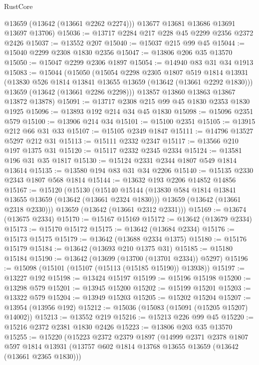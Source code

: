 \begin{lexlean}{RustCore}
\begin{coremodule}
        @13659
        (@13642 (@13661 @2262 @2274)))
      @13677
      @13681
      @13686
      @13691
      @13697
      @13706)
@15036 := @13717 @2284 @217 @228 @45 @2299 @2356 @2372 @2426
@15037 := @13552 @207
@15040 := @15037 @215 @99 @45
@15044 := @15040 @2299 @2308 @1830 @2356
@15047 := @13806 @206 @35 @13570
@15050 := @15047 @2299 @2306 @1897
@15054 := @14940 @83 @31 @34 @1913
@15083 := @15044
    (@15050
      (@15054
        @2298
        @2305
        @1807
        @519
        @1814
        @13931
        (@13830 @526 @1814 @13841 @13655 @13659 (@13642 (@13661 @2292 @1830)))
        @13659
        (@13642 (@13661 @2286 @2298)))
      @13857
      @13860
      @13863
      @13867
      @13872
      @13878)
@15091 := @13717 @2308 @215 @99 @45 @1830 @2353 @1830 @1925
@15096 := @13893 @192 @214 @34 @45 @1830
@15098 := @15096 @2351 @579
@15100 := @13906 @214 @34
@15101 := @15100 @2351
@15105 := @13915 @212 @66 @31 @33
@15107 := @15105 @2349 @1847
@15111 := @14796 @13527 @5297 @212 @31
@15113 := @15111 @2332 @2347
@15117 := @13566 @210 @197 @1375 @31
@15120 := @15117 @2332 @2345 @2334
@15124 := @13581 @196 @31 @35 @1817
@15130 := @15124 @2331 @2344 @1807 @549 @1814 @13614
@15135 := @13580 @194 @83 @31 @34 @2206
@15140 := @15135 @2330 @2343 @1807 @568 @1814
@15144 := @13632 @193 @2206 @14852 @14856
@15167 := @15120
    (@15130
      (@15140
        @15144
        (@13830 @584 @1814 @13841 @13655 @13659 (@13642 (@13661 @2324 @1830)))
        @13659
        (@13642 (@13661 @2318 @2330)))
      @13659
      (@13642 (@13661 @2312 @2331)))
@15169 := @13674 (@13675 @2334)
@15170 := @15167 @15169
@15172 := @13642 (@13679 @2334)
@15173 := @15170 @15172
@15175 := @13642 (@13684 @2334)
@15176 := @15173 @15175
@15179 := @13642 (@13688 @2334 @1375)
@15180 := @15176 @15179
@15184 := @13642 (@13693 @210 @1375 @31)
@15185 := @15180 @15184
@15190 := @13642 (@13699 (@13700 (@13701 @2334)) @5297)
@15196 := @15098 (@15101 (@15107 (@15113 (@15185 @15190)) @13938))
@15197 := @13227 @192
@15198 := @13424 @15197
@15199 := @15196 @15198
@15200 := @13298 @579
@15201 := @13945 @15200
@15202 := @15199 @15201
@15203 := @13322 @579
@15204 := @13949 @15203
@15205 := @15202 @15204
@15207 := @13954 (@13956 @192)
@15212 := @15036 (@15083 (@15091 (@15205 @15207) @14002))
@15213 := @13552 @219
@15216 := @15213 @226 @99 @45
@15220 := @15216 @2372 @2381 @1830 @2426
@15223 := @13806 @203 @35 @13570
@15255 := @15220
    (@15223
      @2372
      @2379
      @1897
      (@14999
        @2371
        @2378
        @1807
        @597
        @1814
        @13931
        (@13757 @602 @1814 @13768 @13655 @13659 (@13642 (@13661 @2365 @1830)))

\end{coremodule}
\end{lexlean}
